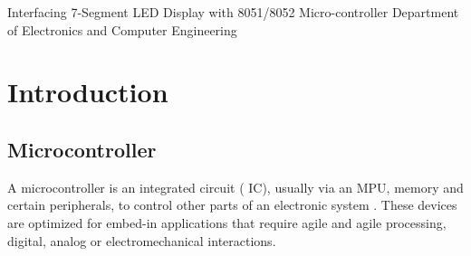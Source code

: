 \documentclass{article}
\begin{document}
{Interfacing 7-Segment LED Display with 8051/8052 Micro-controller}
{Department of Electronics and Computer Engineering}




\tableofcontents
\pagebreak
\listoffigures
\pagebreak
\lstlistoflistings
\pagebreak
{}
\section{Introduction}
\subsection{Microcontroller}

A microcontroller is an integrated circuit ( IC), usually via an MPU, memory and certain peripherals, to control other parts of an electronic system .
These devices are optimized for embed-in applications that require agile and agile processing, digital, analog or electromechanical interactions.
\end{document}
